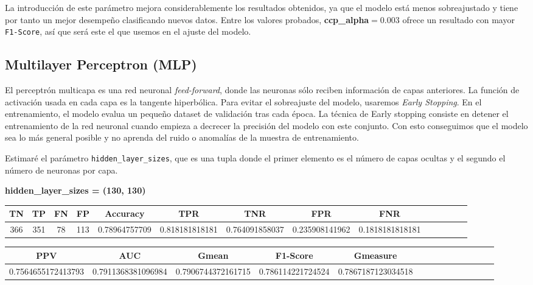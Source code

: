 \documentclass[a4]{article}
\begin{document}
\vspace{5mm}

La introducción de este parámetro mejora considerablemente los resultados obtenidos, ya que el modelo está menos sobreajustado y tiene por tanto un mejor desempeño clasificando nuevos datos. Entre los valores probados, \textbf{ccp\_alpha}$ = 0.003$ ofrece un resultado con mayor \texttt{F1-Score}, así que será este el que usemos en el ajuste del modelo.

\subsection{Multilayer Perceptron (MLP)}

El perceptrón multicapa es una red neuronal \textit{feed-forward}, donde las neuronas sólo reciben información de capas anteriores. La función de activación usada en cada capa es la tangente hiperbólica. Para evitar el sobreajuste del modelo, usaremos \textit{Early Stopping}. En el entrenamiento, el modelo evalua un pequeño dataset de validación tras cada época. La técnica de Early stopping consiste en detener el entrenamiento de la red neuronal cuando empieza a decrecer la precisión del modelo con este conjunto. Con esto conseguimos que el modelo sea lo más general posible y no aprenda del ruido o anomalías de la muestra de entrenamiento.

Estimaré el parámetro \texttt{hidden\_layer\_sizes}, que es una tupla donde el primer elemento es el número de capas ocultas y el segundo el número de neuronas por capa.

\textbf{hidden\_layer\_sizes = (130, 130)}
\begin{center}
\begin{tabular}{|c|c|c|c|c|c|c|c|c|c|c|c|c|c|}
\hline
\multicolumn{1}{|c|}{\textbf{TN}}& \textbf{TP} & \textbf{FN} & \textbf{FP} & \textbf{Accuracy} & \textbf{TPR} & \textbf{TNR} & \textbf{FPR} &\textbf{FNR} \\ \hline
  366 & 351 & 78 & 113 & 0.78964757709 & 0.818181818181 & 0.764091858037 & 0.235908141962 & 0.1818181818181 \\ \hline
\end{tabular}
\end{center}

\begin{center}
\begin{tabular}{|c|c|c|c|c|c|c|c|c|c|c|c|c|c|}
\hline
\multicolumn{1}{|c|}{\textbf{PPV}} & \textbf{AUC} & \textbf{Gmean} & \textbf{F1-Score} & \textbf{Gmeasure}  \\ \hline
  0.7564655172413793 & 0.7911368381096984 & 0.7906744372161715 & 0.786114221724524 & 0.7867187123034518 \\ \hline
\end{tabular}
\end{center}
\end{document}
